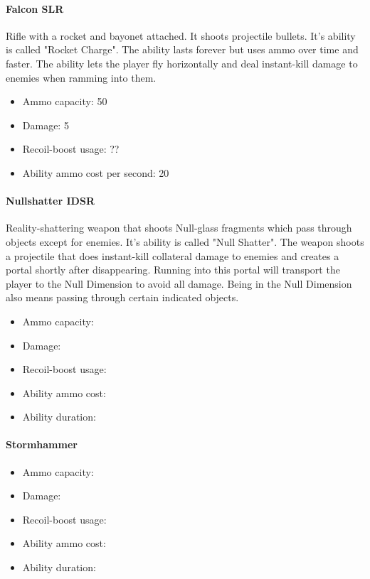\documentclass[12pt]{article}
\begin{document}
\paragraph{Falcon SLR}

Rifle with a rocket and bayonet attached. It shoots projectile bullets. It's ability is called "Rocket Charge". The ability lasts forever but uses ammo over time and faster. The ability lets the player fly horizontally and deal instant-kill damage to enemies when ramming into them.

\begin{itemize}
	\item Ammo capacity: 50
	\item Damage: 5
	\item Recoil-boost usage: ??
	\item Ability ammo cost per second: 20
\end{itemize} 


\paragraph{Nullshatter IDSR}

Reality-shattering weapon that shoots Null-glass fragments which pass through objects except for enemies. It's ability is called "Null Shatter". The weapon shoots a projectile that does instant-kill collateral damage to enemies and creates a portal shortly after disappearing. Running into this portal will transport the player to the Null Dimension to avoid all damage. Being in the Null Dimension also means passing through certain indicated objects. 

\begin{itemize}
	\item Ammo capacity: 
	\item Damage: 
	\item Recoil-boost usage: 
	\item Ability ammo cost: 
	\item Ability duration: 
\end{itemize}

\paragraph{Stormhammer}

\begin{itemize}
	\item Ammo capacity: 
	\item Damage: 
	\item Recoil-boost usage: 
	\item Ability ammo cost: 
	\item Ability duration: 
\end{itemize}
\end{document}
